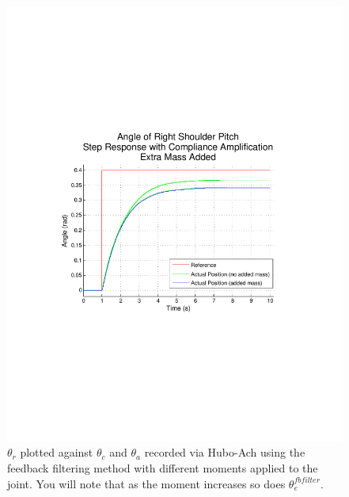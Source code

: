\begin{figure}[thpb]
  \centering
\includegraphics[width=0.8\columnwidth]{./examples/pix/RSP-Zp4-step-enc-mass-real-crop.pdf}
  \caption{$\theta_r$ plotted against $\theta_c$ and $\theta_a$ recorded via Hubo-Ach using the feedback filtering method with different moments applied to the joint.  You will note that as the moment increases so does $\theta_e^{fbfilter}$. }
  \label{fig:singleJointStepFilteredFeedbackMoment}
\end{figure}
